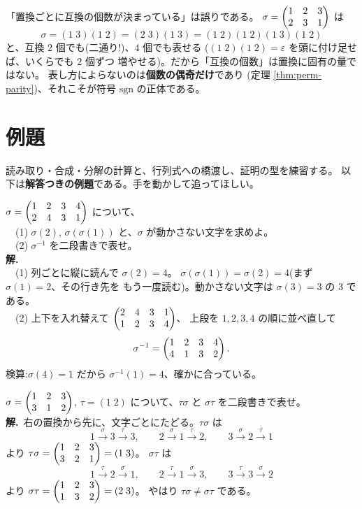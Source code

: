 \begin{hanrei}\label{hanrei:perm-count}
「置換ごとに互換の個数が決まっている」は誤りである。
$\sigma = \begin{pmatrix}1 & 2 & 3 \\ 2 & 3 & 1\end{pmatrix}$ は
\[
\sigma = (1\;3)(1\;2) = (2\;3)(1\;3) = (1\;2)(1\;2)(1\;3)(1\;2)
\]
と、互換 $2$ 個でも(二通り!)、$4$ 個でも表せる
($(1\;2)(1\;2) = \varepsilon$ を頭に付け足せば、いくらでも $2$ 個ずつ
増やせる)。だから「互換の個数」は置換に固有の量ではない。
表し方によらないのは\textbf{個数の偶奇だけ}であり
(定理 \ref{thm:perm-parity})、それこそが符号 $\mathrm{sgn}$ の正体である。
\end{hanrei}

\section{例題}

読み取り・合成・分解の計算と、行列式への橋渡し、証明の型を練習する。
以下は\textbf{解答つきの例題}である。手を動かして追ってほしい。

\begin{rei}[例題・基本(二段書きの読み取りと逆置換)]\label{rei:perm-read}
$\sigma = \begin{pmatrix}1 & 2 & 3 & 4 \\ 2 & 4 & 3 & 1\end{pmatrix}$ について、\\
　(1) $\sigma(2)$, $\sigma(\sigma(1))$ と、$\sigma$ が動かさない文字を求めよ。\\
　(2) $\sigma^{-1}$ を二段書きで表せ。\\
\textbf{解.}\\
　(1) 列ごとに縦に読んで $\sigma(2) = 4$。
$\sigma(\sigma(1)) = \sigma(2) = 4$(まず $\sigma(1) = 2$、その行き先を
もう一度読む)。動かさない文字は $\sigma(3) = 3$ の $3$ である。\\
　(2) 上下を入れ替えて $\begin{pmatrix}2 & 4 & 3 & 1 \\ 1 & 2 & 3 & 4\end{pmatrix}$、
上段を $1, 2, 3, 4$ の順に並べ直して
\[
\sigma^{-1} = \begin{pmatrix}1 & 2 & 3 & 4 \\ 4 & 1 & 3 & 2\end{pmatrix}.
\]
検算:$\sigma(4) = 1$ だから $\sigma^{-1}(1) = 4$、確かに合っている。
\end{rei}

\begin{rei}[例題・基本(合成の計算)]\label{rei:perm-comp-ex}
$\sigma = \begin{pmatrix}1 & 2 & 3 \\ 3 & 1 & 2\end{pmatrix}$,
$\tau = (1\;2)$ について、$\tau\sigma$ と $\sigma\tau$ を二段書きで表せ。\\
\textbf{解.}\ 右の置換から先に、文字ごとにたどる。$\tau\sigma$ は
\[
1 \xrightarrow{\ \sigma\ } 3 \xrightarrow{\ \tau\ } 3, \qquad
2 \xrightarrow{\ \sigma\ } 1 \xrightarrow{\ \tau\ } 2, \qquad
3 \xrightarrow{\ \sigma\ } 2 \xrightarrow{\ \tau\ } 1
\]
より $\tau\sigma = \begin{pmatrix}1 & 2 & 3 \\ 3 & 2 & 1\end{pmatrix} = (1\;3)$。
$\sigma\tau$ は
\[
1 \xrightarrow{\ \tau\ } 2 \xrightarrow{\ \sigma\ } 1, \qquad
2 \xrightarrow{\ \tau\ } 1 \xrightarrow{\ \sigma\ } 3, \qquad
3 \xrightarrow{\ \tau\ } 3 \xrightarrow{\ \sigma\ } 2
\]
より $\sigma\tau = \begin{pmatrix}1 & 2 & 3 \\ 1 & 3 & 2\end{pmatrix} = (2\;3)$。
やはり $\tau\sigma \neq \sigma\tau$ である。
\end{rei}

